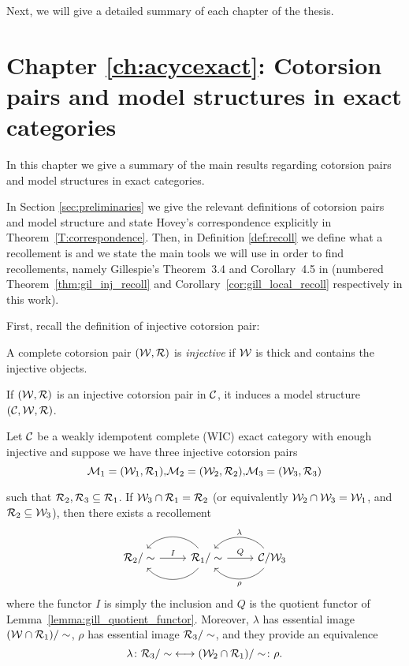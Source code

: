 Next, we will give a detailed summary of each chapter of the thesis.

\section*{Chapter \ref{ch:acycexact}: Cotorsion pairs and model structures in exact categories}

In this chapter we give a summary of the main results regarding cotorsion pairs and model structures in exact categories.

In Section \ref{sec:preliminaries} we give the relevant definitions of cotorsion pairs and model structure and state Hovey's correspondence explicitly in Theorem~\ref{T:correspondence}.
Then, in Definition \ref{def:recoll} we define what a recollement is and we state the main tools we will use in order to find recollements, namely Gillespie's Theorem~3.4 and Corollary~4.5 in \cite{G7} (numbered Theorem~\ref{thm:gil_inj_recoll} and Corollary~\ref{cor:gill_local_recoll} respectively in this work).

First, recall the definition of injective cotorsion pair:
\begin{nonlisting_def}
  A complete cotorsion pair $(\mathcal{W},\mathcal{R})$ is \emph{injective} if $\mathcal{W}$ is thick and contains the injective objects.

  If $(\mathcal{W},\mathcal{R})$ is an injective cotorsion pair in $\mathcal{C}$, it induces a model structure $(\mathcal{C},\mathcal{W},\mathcal{R})$.
\end{nonlisting_def}

\begin{nonlisting_thm}[\ref{thm:gil_inj_recoll}]
  Let $\mathcal{C}$ be a weakly idempotent complete (WIC) exact category with enough injective and suppose we have three injective cotorsion pairs
  \[
    \M_1=(\W_1,\R_1)\text{,\hfill}\M_2=(\W_2,\R_2)\text{,\hfill}\M_3=(\W_3,\R_3)
  \]
  \begin{sloppypar}
  such that $\mathcal{R}_2,\mathcal{R}_3\subseteq \mathcal{R}_1$. If $\mathcal{W}_3\cap\mathcal{R}_1=\mathcal{R}_2$ (or equivalently ${\mathcal{W}_2\cap\mathcal{W}_3=\mathcal{W}_1}$, and $\mathcal{R}_2\subseteq \mathcal{W}_3$), then there exists a recollement
  \begin{equation*}
    \begin{tikzcd}
      {\R_2/\sim}\arrow{r}{I}
      & {\R_1/\sim}\arrow[bend left=50]{l}\arrow[bend right=50]{l}\arrow{r}{Q}
      & \C/\W_3\arrow[bend left=50]{l}{\rho}\arrow[bend right=50]{l}[']{\lambda}
    \end{tikzcd}
  \end{equation*}
  where the functor $I$ is simply the inclusion and $Q$ is the quotient functor of Lemma~\ref{lemma:gill_quotient_functor}. Moreover, $\lambda$ has essential image $(\mathcal{W}\cap\mathcal{R}_1)/\sim$, $\rho$ has essential image ${\mathcal{R}_3/\sim}$, and they provide an equivalence \[\lambda\colon{\mathcal{R}_3/\sim} \longleftrightarrow (\mathcal{W}_2\cap\mathcal{R}_1)/\sim\colon\rho.\]
\end{sloppypar}
\end{nonlisting_thm}

